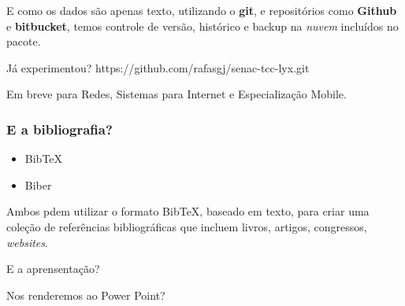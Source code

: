 \documentclass[aspect=43,14pt]{beamer}
\begin{document}
\begin{frame}
        \vspace{2cm}
        E como os dados são apenas texto, utilizando o \textbf{git}, e repositórios
        como \textbf{Github} e \textbf{bitbucket}, temos controle de versão, histórico
        e backup na \emph{nuvem} incluídos no pacote.
\end{frame}

\begin{frame}
    \begin{center}
    \vfill
    Já experimentou?
    \vfill
    \large{https://github.com/rafasgj/senac-tcc-lyx.git}
    \vfill
    \end{center}
    \tiny \color{gray} Em breve para Redes, Sistemas para Internet e Especialização Mobile.
\end{frame}

\begin{frame}
    \frametitle{E a bibliografia?}
    \begin{itemize}
        \item{BibTeX}
        \item{Biber}
    \end{itemize}

    Ambos pdem utilizar o formato BibTeX, baseado em texto, para criar uma coleção
    de referências bibliográficas que incluem livros, artigos, congressos, \emph{websites}.
\end{frame}

{%
    \begin{frame}[t]
        \color{white} \huge E a aprensentação?
    \end{frame}
}

\begin{frame}
    \begin{center}
    \Huge Nos renderemos ao Power Point?
    \end{center}
\end{frame}
\end{document}
